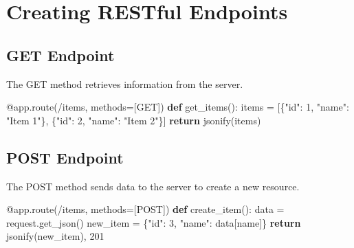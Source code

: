 \documentclass[
  letterpaper,
  DIV=11,
  numbers=noendperiod]{scrreprt}
\newenvironment{Shaded}{\begin{snugshade}}{\end{snugshade}}
\newcommand{\AttributeTok}[1]{\textcolor[rgb]{0.40,0.45,0.13}{#1}}
\newcommand{\ControlFlowTok}[1]{\textcolor[rgb]{0.00,0.23,0.31}{\textbf{#1}}}
\newcommand{\DecValTok}[1]{\textcolor[rgb]{0.68,0.00,0.00}{#1}}
\newcommand{\KeywordTok}[1]{\textcolor[rgb]{0.00,0.23,0.31}{\textbf{#1}}}
\newcommand{\NormalTok}[1]{\textcolor[rgb]{0.00,0.23,0.31}{#1}}
\newcommand{\OperatorTok}[1]{\textcolor[rgb]{0.37,0.37,0.37}{#1}}
\newcommand{\StringTok}[1]{\textcolor[rgb]{0.13,0.47,0.30}{#1}}
\begin{document}
\section{Creating RESTful Endpoints}\label{creating-restful-endpoints}

\subsection{GET Endpoint}\label{get-endpoint}

The GET method retrieves information from the server.

\begin{Shaded}
\begin{Highlighting}[]
\AttributeTok{@app.route}\NormalTok{(}\StringTok{\textquotesingle{}/items\textquotesingle{}}\NormalTok{, methods}\OperatorTok{=}\NormalTok{[}\StringTok{\textquotesingle{}GET\textquotesingle{}}\NormalTok{])}
\KeywordTok{def}\NormalTok{ get\_items():}
\NormalTok{    items }\OperatorTok{=}\NormalTok{ [\{}\StringTok{"id"}\NormalTok{: }\DecValTok{1}\NormalTok{, }\StringTok{"name"}\NormalTok{: }\StringTok{"Item 1"}\NormalTok{\}, \{}\StringTok{"id"}\NormalTok{: }\DecValTok{2}\NormalTok{, }\StringTok{"name"}\NormalTok{: }\StringTok{"Item 2"}\NormalTok{\}]}
    \ControlFlowTok{return}\NormalTok{ jsonify(items)}
\end{Highlighting}
\end{Shaded}

\subsection{POST Endpoint}\label{post-endpoint}

The POST method sends data to the server to create a new resource.

\begin{Shaded}
\begin{Highlighting}[]
\AttributeTok{@app.route}\NormalTok{(}\StringTok{\textquotesingle{}/items\textquotesingle{}}\NormalTok{, methods}\OperatorTok{=}\NormalTok{[}\StringTok{\textquotesingle{}POST\textquotesingle{}}\NormalTok{])}
\KeywordTok{def}\NormalTok{ create\_item():}
\NormalTok{    data }\OperatorTok{=}\NormalTok{ request.get\_json()}
\NormalTok{    new\_item }\OperatorTok{=}\NormalTok{ \{}\StringTok{"id"}\NormalTok{: }\DecValTok{3}\NormalTok{, }\StringTok{"name"}\NormalTok{: data[}\StringTok{\textquotesingle{}name\textquotesingle{}}\NormalTok{]\}}
    \ControlFlowTok{return}\NormalTok{ jsonify(new\_item), }\DecValTok{201}
\end{Highlighting}
\end{Shaded}
\end{document}
